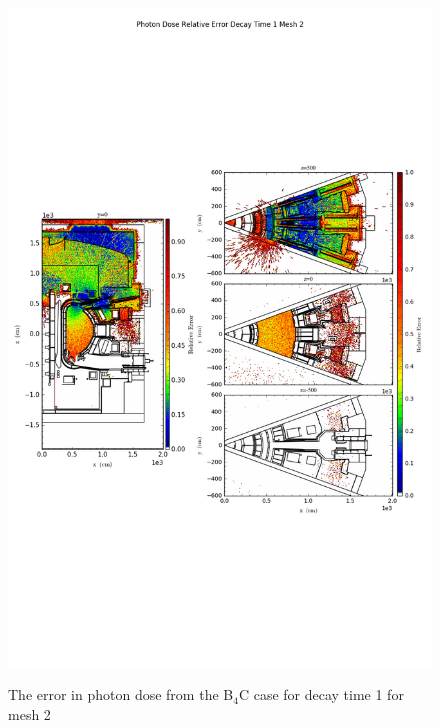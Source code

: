 \begin{figure}[ht!]
\centering
\includegraphics[trim={0cm 9cm 0cm 10cm},clip,scale=0.75]{../plots/final_model_with_b4c/Photon_Dose_Relative_Error_Decay_Time_1_Mesh_2.png}
\label{fig:photons_dc1_no4bc_m2_error}
\caption{The error in photon dose from the B$_4$C case for decay time 1 for mesh 2}
\end{figure}
